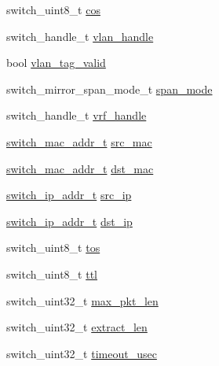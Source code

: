 \begin{DoxyCompactItemize}
\item 
switch\+\_\+uint8\+\_\+t \hyperlink{structswitch__api__mirror__info__s_a05cf7979699265bac77b111c3777c717}{cos}
\item 
switch\+\_\+handle\+\_\+t \hyperlink{structswitch__api__mirror__info__s_a75e656875bcde00f5b3b05735f78aada}{vlan\+\_\+handle}
\item 
bool \hyperlink{structswitch__api__mirror__info__s_a94f7176a1219b8ae7444aefc40d31dd9}{vlan\+\_\+tag\+\_\+valid}
\item 
switch\+\_\+mirror\+\_\+span\+\_\+mode\+\_\+t \hyperlink{structswitch__api__mirror__info__s_a5c5ce47346d3a4907e3212f4e1dbde9f}{span\+\_\+mode}
\item 
switch\+\_\+handle\+\_\+t \hyperlink{structswitch__api__mirror__info__s_ac9ab8271227d7a182942c0c1242332ac}{vrf\+\_\+handle}
\item 
\hyperlink{structswitch__mac__addr__s}{switch\+\_\+mac\+\_\+addr\+\_\+t} \hyperlink{structswitch__api__mirror__info__s_a6b891c383c102ccdba6ee068a0cbfb31}{src\+\_\+mac}
\item 
\hyperlink{structswitch__mac__addr__s}{switch\+\_\+mac\+\_\+addr\+\_\+t} \hyperlink{structswitch__api__mirror__info__s_aa6b7290b4dfed262b43f114c220bb318}{dst\+\_\+mac}
\item 
\hyperlink{structswitch__ip__addr__s}{switch\+\_\+ip\+\_\+addr\+\_\+t} \hyperlink{structswitch__api__mirror__info__s_a967ce2b13a0b353581ac16523530a1ec}{src\+\_\+ip}
\item 
\hyperlink{structswitch__ip__addr__s}{switch\+\_\+ip\+\_\+addr\+\_\+t} \hyperlink{structswitch__api__mirror__info__s_a864421edded9a8792cd846748c1b1574}{dst\+\_\+ip}
\item 
switch\+\_\+uint8\+\_\+t \hyperlink{structswitch__api__mirror__info__s_a1d2704eb0f9a7c224c7d63c6fafa1206}{tos}
\item 
switch\+\_\+uint8\+\_\+t \hyperlink{structswitch__api__mirror__info__s_aa9ee0d1fcf9ff4eba0ccbd7c8b619c43}{ttl}
\item 
switch\+\_\+uint32\+\_\+t \hyperlink{structswitch__api__mirror__info__s_ae8ad00a0d2994470ee7f4575ffbee8b7}{max\+\_\+pkt\+\_\+len}
\item 
switch\+\_\+uint32\+\_\+t \hyperlink{structswitch__api__mirror__info__s_a5761ff09e7becd993b4e9b877e1d22b2}{extract\+\_\+len}
\item 
switch\+\_\+uint32\+\_\+t \hyperlink{structswitch__api__mirror__info__s_a6068e1833b8c7f498be3cb44f27b46eb}{timeout\+\_\+usec}
\end{DoxyCompactItemize}


